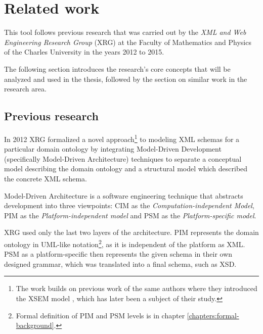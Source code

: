 \chapter{Related work}
\label{chapters:related-work}

This tool follows previous research that was carried out by the \textit{XML and Web Engineering Research Group} (XRG) at the Faculty of Mathematics and Physics of the Charles University in the years 2012 to 2015.

The following section introduces the research's core concepts that will be analyzed and used in the thesis, followed by the section on similar work in the research area.

\section{Previous research}

In 2012 XRG formalized a novel approach\footnote{The work builds on previous work of the same authors where they introduced the XSEM model \cite{necasky2007xsem}, which has later been a subject of their study.} to modeling XML schemas \cite{necasky2012conceptual} for a particular domain ontology by integrating Model-Driven Development (specifically Model-Driven Architecture) techniques to separate a conceptual model describing the domain ontology and a structural model which described the concrete XML schema.

Model-Driven Architecture is a software engineering technique that abstracts development into three viewpoints: CIM as the \textit{Computation-independent Model}, PIM as the \textit{Platform-independent model} and PSM as the \textit{Platform-specific model}.

XRG used only the last two layers of the architecture. PIM represents the domain ontology in UML-like notation\footnote{Formal definition of PIM and PSM levels is in chapter \ref{chapters:formal-background}.}, as it is independent of the platform as XML. PSM as a platform-specific then represents the given schema in their own designed grammar, which was translated into a final schema, such as XSD.

